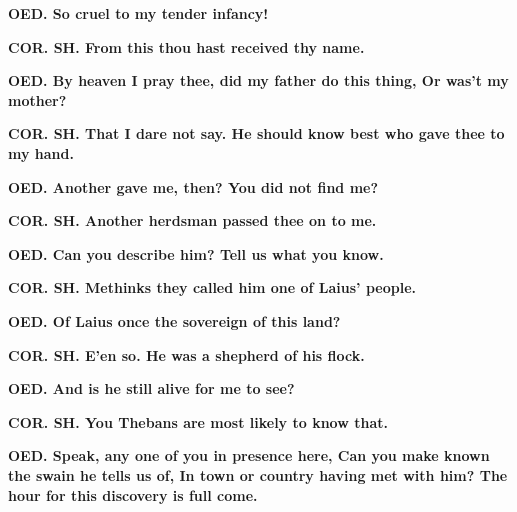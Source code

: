 \documentclass[11pt,letter]{book}
\begin{document}
\par \textbf{OED. So cruel to my tender infancy!}
\par 

\par \textbf{COR. SH. From this thou hast received thy name.}
\par 

\par \textbf{OED. By heaven I pray thee, did my father do this thing, Or was’t my mother?}
\par 

\par \textbf{COR. SH. That I dare not say. He should know best who gave thee to my hand.}
\par 

\par \textbf{OED. Another gave me, then? You did not find me?}
\par 

\par \textbf{COR. SH. Another herdsman passed thee on to me.}
\par 

\par \textbf{OED. Can you describe him? Tell us what you know.}
\par 

\par \textbf{COR. SH. Methinks they called him one of Laius’ people.}
\par 

\par \textbf{OED. Of Laius once the sovereign of this land?}
\par 

\par \textbf{COR. SH. E’en so. He was a shepherd of his flock.}
\par 

\par \textbf{OED. And is he still alive for me to see?}
\par 

\par \textbf{COR. SH. You Thebans are most likely to know that.}
\par 

\par \textbf{OED. Speak, any one of you in presence here, Can you make known the swain he tells us of, In town or country having met with him? The hour for this discovery is full come.}
\par 
\end{document}
